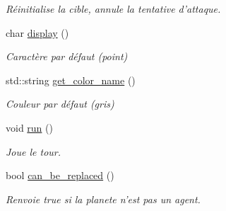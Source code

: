 \begin{DoxyCompactItemize}
\begin{DoxyCompactList}\small\item\em Réinitialise la cible, annule la tentative d'attaque. \end{DoxyCompactList}\item 
\hypertarget{classColonized__planet_a1d3897c8ef1772fa9908fee7c5830f77}{char \hyperlink{classColonized__planet_a1d3897c8ef1772fa9908fee7c5830f77}{display} ()}\label{classColonized__planet_a1d3897c8ef1772fa9908fee7c5830f77}

\begin{DoxyCompactList}\small\item\em Caractère par défaut (point) \end{DoxyCompactList}\item 
\hypertarget{classColonized__planet_af8e3c6d3e72bf80b2e44013ceba2087f}{std\-::string \hyperlink{classColonized__planet_af8e3c6d3e72bf80b2e44013ceba2087f}{get\-\_\-color\-\_\-name} ()}\label{classColonized__planet_af8e3c6d3e72bf80b2e44013ceba2087f}

\begin{DoxyCompactList}\small\item\em Couleur par défaut (gris) \end{DoxyCompactList}\item 
void \hyperlink{classColonized__planet_ab8d7c5d4c58fed9239277f18b9de174a}{run} ()
\begin{DoxyCompactList}\small\item\em Joue le tour. \end{DoxyCompactList}\item 
\hypertarget{classColonized__planet_ad364c3baffd5ad81d3208b1228cc35e4}{bool \hyperlink{classColonized__planet_ad364c3baffd5ad81d3208b1228cc35e4}{can\-\_\-be\-\_\-replaced} ()}\label{classColonized__planet_ad364c3baffd5ad81d3208b1228cc35e4}

\begin{DoxyCompactList}\small\item\em Renvoie true si la planete n'est pas un agent. \end{DoxyCompactList}\end{DoxyCompactItemize}
